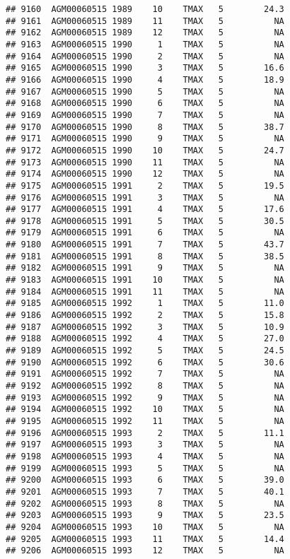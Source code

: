 \documentclass{article}\usepackage[]{graphicx}\usepackage[]{color}
\makeatletter
\newenvironment{kframe}{%
 \def\at@end@of@kframe{}%
 \ifinner\ifhmode%
  \def\at@end@of@kframe{\end{minipage}}%
  \begin{minipage}{\columnwidth}%
 \fi\fi%
 \def\FrameCommand##1{\hskip\@totalleftmargin \hskip-\fboxsep
 \colorbox{shadecolor}{##1}\hskip-\fboxsep
     \hskip-\linewidth \hskip-\@totalleftmargin \hskip\columnwidth}%
 \MakeFramed {\advance\hsize-\width
   \@totalleftmargin\z@ \linewidth\hsize
   \@setminipage}}%
 {\par\unskip\endMakeFramed%
 \at@end@of@kframe}
\newenvironment{knitrout}{}{} %
\makeatother
\begin{document}
\begin{knitrout}
\begin{kframe}
\begin{verbatim}
## 9160  AGM00060515 1989    10    TMAX   5        24.3
## 9161  AGM00060515 1989    11    TMAX   5          NA
## 9162  AGM00060515 1989    12    TMAX   5          NA
## 9163  AGM00060515 1990     1    TMAX   5          NA
## 9164  AGM00060515 1990     2    TMAX   5          NA
## 9165  AGM00060515 1990     3    TMAX   5        16.6
## 9166  AGM00060515 1990     4    TMAX   5        18.9
## 9167  AGM00060515 1990     5    TMAX   5          NA
## 9168  AGM00060515 1990     6    TMAX   5          NA
## 9169  AGM00060515 1990     7    TMAX   5          NA
## 9170  AGM00060515 1990     8    TMAX   5        38.7
## 9171  AGM00060515 1990     9    TMAX   5          NA
## 9172  AGM00060515 1990    10    TMAX   5        24.7
## 9173  AGM00060515 1990    11    TMAX   5          NA
## 9174  AGM00060515 1990    12    TMAX   5          NA
## 9175  AGM00060515 1991     2    TMAX   5        19.5
## 9176  AGM00060515 1991     3    TMAX   5          NA
## 9177  AGM00060515 1991     4    TMAX   5        17.6
## 9178  AGM00060515 1991     5    TMAX   5        30.5
## 9179  AGM00060515 1991     6    TMAX   5          NA
## 9180  AGM00060515 1991     7    TMAX   5        43.7
## 9181  AGM00060515 1991     8    TMAX   5        38.5
## 9182  AGM00060515 1991     9    TMAX   5          NA
## 9183  AGM00060515 1991    10    TMAX   5          NA
## 9184  AGM00060515 1991    11    TMAX   5          NA
## 9185  AGM00060515 1992     1    TMAX   5        11.0
## 9186  AGM00060515 1992     2    TMAX   5        15.8
## 9187  AGM00060515 1992     3    TMAX   5        10.9
## 9188  AGM00060515 1992     4    TMAX   5        27.0
## 9189  AGM00060515 1992     5    TMAX   5        24.5
## 9190  AGM00060515 1992     6    TMAX   5        30.6
## 9191  AGM00060515 1992     7    TMAX   5          NA
## 9192  AGM00060515 1992     8    TMAX   5          NA
## 9193  AGM00060515 1992     9    TMAX   5          NA
## 9194  AGM00060515 1992    10    TMAX   5          NA
## 9195  AGM00060515 1992    11    TMAX   5          NA
## 9196  AGM00060515 1993     2    TMAX   5        11.1
## 9197  AGM00060515 1993     3    TMAX   5          NA
## 9198  AGM00060515 1993     4    TMAX   5          NA
## 9199  AGM00060515 1993     5    TMAX   5          NA
## 9200  AGM00060515 1993     6    TMAX   5        39.0
## 9201  AGM00060515 1993     7    TMAX   5        40.1
## 9202  AGM00060515 1993     8    TMAX   5          NA
## 9203  AGM00060515 1993     9    TMAX   5        23.5
## 9204  AGM00060515 1993    10    TMAX   5          NA
## 9205  AGM00060515 1993    11    TMAX   5        14.4
## 9206  AGM00060515 1993    12    TMAX   5          NA

\end{verbatim}
\end{kframe}
\end{knitrout}
\end{document}
